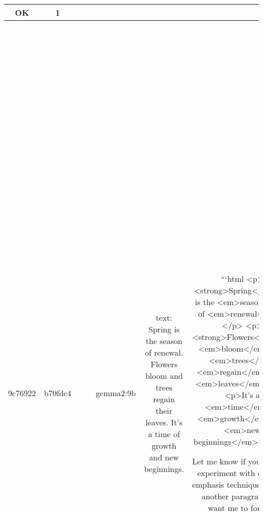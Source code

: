 \begin{table}[h!]
\begin{tabular}{|c|c|c|c|c|c|c|c|c|c|}
OK & 1\\
\hline
9c76922 & b70fdc4 &  &  & gemma2:9b & text: Spring is the season of renewal. Flowers bloom and trees regain their leaves. It's a time of growth and new beginnings. & ```html
<p><strong>Spring</strong> is the <em>season</em> of <em>renewal</em>.</p>
<p><strong>Flowers</strong> <em>bloom</em> and <em>trees</em> <em>regain</em> their <em>leaves</em>.</p>
<p>It's a <em>time</em> of <em>growth</em> and <em>new beginnings</em>.</p> 
``` 



Let me know if you'd like to experiment with different emphasis techniques or have another paragraph you want me to format! & err & - The output has three `<p>` tags, which fulfills the requirement of having at least three `<p>` tags.
- Each `<p>` tag contains at least one `<strong>` tag. The first sentence contains a `<strong>` tag around "Spring", the second sentence contains a `<strong>` tag around "Flowers", and the third sentence does not have a `<strong>` tag.
- Each `<p>` tag contains multiple `<em>` tags to emphasize key words and phrases.

The violation here is that the third `<p>` tag is missing a `<strong>` tag, which is part of the requirement to have at least one `<strong>` tag within each `<p>` tag. 

ERR & 1\\
\hline
9c76922 & b70fdc4 &  &  & qwen2.5:3b & text: Spring is the season of renewal. Flowers bloom and trees regain their leaves. It's a time of growth and new beginnings. & ```html
<p><strong>Spring</strong> is the season of <em>renewal</em>.<br></p>
<p>Flowers <strong>bloom</strong> and trees regain their <em>leaves</em>.<br></p>
<p>It's a time of <strong>growth</strong> and new <em>beginnings</em>.</p>
``` & ok & The chatbot output consists of three <p> tags, each containing a sentence, which satisfies the requirement of having at least three <p> tags with each sentence wrapped in a separate <p> tag. In each <p> tag, there is one <strong> tag, and there are multiple <em> tags, which fulfills the requirement of having one <strong> tag and multiple <em> tags to emphasize key words and phrases. Therefore, the output complies with the description provided.

No violation.
OK & 1\\
\hline
9c76922 & b70fdc4 &  &  & llama3.2:1b & text: Spring is the season of renewal. Flowers bloom and trees regain their leaves. It's a time of growth and new beginnings. & Here is the formatted paragraph with <p> tags, <strong>, and <em> tags as requested:


\end{tabular}
\end{table}
